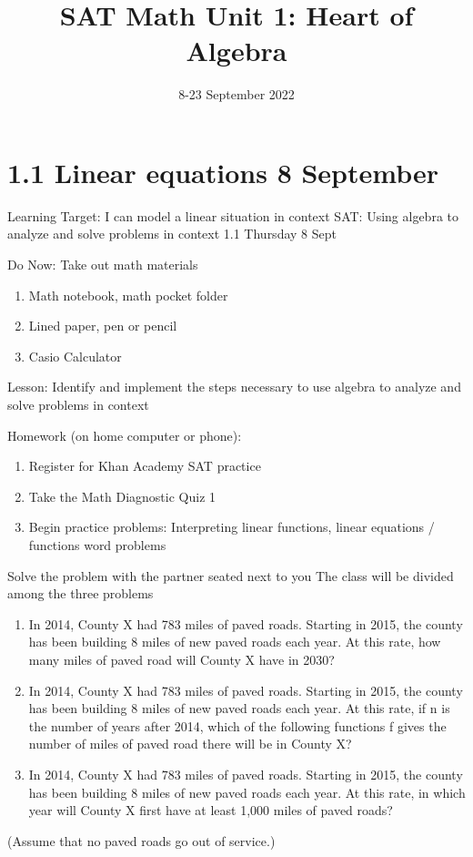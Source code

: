\documentclass[onlytextwidth]{beamer}
\title{SAT Math Unit 1: Heart of Algebra}
\date{8-23 September 2022}
\begin{document}
\frame{\titlepage}

\section[Outline]{}
\frame{\tableofcontents}

\section{1.1 Linear equations \hfill 8 September}
\begin{frame}{Learning Target: I can model a linear situation in context}
  {SAT: Using algebra to analyze and solve problems in
  context \hfill \alert{1.1 Thursday 8 Sept}}
  \begin{block}{Do Now: Take out math materials}
    \begin{enumerate}
        \item Math notebook, math pocket folder
        \item Lined paper, pen or pencil
        \item Casio Calculator
    \end{enumerate}
    \end{block}
    Lesson: Identify and implement the steps necessary to use algebra to analyze and
    solve problems in context \par \medskip
    Homework (on home computer or phone): 
    \begin{enumerate}
      \item Register for Khan Academy SAT practice
      \item Take the Math Diagnostic Quiz 1
      \item Begin practice problems: Interpreting linear functions, linear equations / functions word problems
    \end{enumerate}
  \end{frame}

\begin{frame}{Solve the problem with the partner seated next to you}
  {The class will be divided among the three problems}
  \begin{enumerate}
    \item In 2014, County X had 783 miles of paved roads. Starting in 2015, the county has
    been building 8 miles of new paved roads each year. At this rate, how many miles
    of paved road will County X have in 2030?
    \item In 2014, County X had 783 miles of paved roads. Starting in 2015, the county has
    been building 8 miles of new paved roads each year. At this rate, if n is the number
    of years after 2014, which of the following functions f gives the number of miles
    of paved road there will be in County X?
    \item In 2014, County X had 783 miles of paved roads. Starting in 2015, the county has
    been building 8 miles of new paved roads each year. At this rate, in which year will
    County X first have at least 1,000 miles of paved roads?
  \end{enumerate}
  (Assume that no paved roads go out of service.)
  \end{frame}
\end{document}
